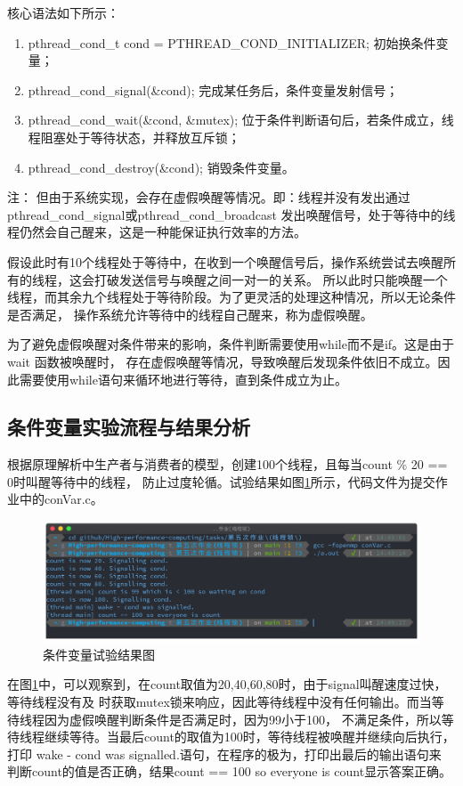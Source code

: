 \documentclass[11pt]{ctexart}
\newenvironment{note}{\kaishu 注：}{}
\begin{document}
核心语法如下所示：
\begin{enumerate}
    \item {\ttfamily pthread\_cond\_t cond = PTHREAD\_COND\_INITIALIZER;} 初始换条件变量；
    \item {\ttfamily pthread\_cond\_signal(\&cond);} 完成某任务后，条件变量发射信号；
    \item {\ttfamily pthread\_cond\_wait(\&cond, \&mutex);} 位于条件判断语句后，若条件成立，线程阻塞处于等待状态，并释放互斥锁；
    \item {\ttfamily pthread\_cond\_destroy(\&cond);} 销毁条件变量。
\end{enumerate}

\begin{note}
但由于系统实现，会存在虚假唤醒等情况。即：线程并没有发出通过{\ttfamily pthread\_cond\_signal}或{\ttfamily pthread\_cond\_broadcast}
发出唤醒信号，处于等待中的线程仍然会自己醒来，这是一种能保证执行效率的方法。

假设此时有10个线程处于等待中，在收到一个唤醒信号后，操作系统尝试去唤醒所有的线程，这会打破发送信号与唤醒之间一对一的关系。
所以此时只能唤醒一个线程，而其余九个线程处于等待阶段。为了更灵活的处理这种情况，所以无论条件是否满足，
操作系统允许等待中的线程自己醒来，称为虚假唤醒。

为了避免虚假唤醒对条件带来的影响，条件判断需要使用{\ttfamily while}而不是{\ttfamily if}。这是由于 wait 函数被唤醒时，
存在虚假唤醒等情况，导致唤醒后发现条件依旧不成立。因此需要使用{\ttfamily while}语句来循环地进行等待，直到条件成立为止。
\end{note}

\subsection{条件变量实验流程与结果分析}

根据原理解析中生产者与消费者的模型，创建100个线程，且每当{\ttfamily count \% 20 == 0}时叫醒等待中的线程，
防止过度轮循。试验结果如图\ref{cond}所示，代码文件为提交作业中的{\ttfamily conVar.c}。

\begin{figure}[h]
    \centering
    \includegraphics[scale=0.35]{../cond.png}
    \caption{条件变量试验结果图}
    \label{cond}
\end{figure}

在图\ref{cond}中，可以观察到，在{\ttfamily count}取值为20,40,60,80时，由于{\ttfamily signal}叫醒速度过快，等待线程没有及
时获取{\ttfamily mutex}锁来响应，因此等待线程中没有任何输出。而当等待线程因为虚假唤醒判断条件是否满足时，因为99小于100，
不满足条件，所以等待线程继续等待。当最后{\ttfamily count}的取值为100时，等待线程被唤醒并继续向后执行，打印
{ wake - cond was signalled.}语句，在程序的极为，打印出最后的输出语句来
判断{\ttfamily count}的值是否正确，结果{ count == 100 so everyone is count}显示答案正确。
\end{document}
